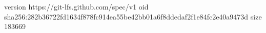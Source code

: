 version https://git-lfs.github.com/spec/v1
oid sha256:282b36722fd1634f878fc914ea55be42bb01a6f8ddedaf2f1e84fc2e40a9473d
size 183669
